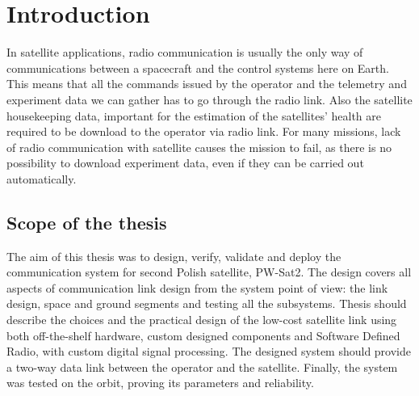 \chapter{Introduction}
In satellite applications, radio communication is usually the only way of communications between a spacecraft and the control systems here on Earth. This means that all the commands issued by the operator and the telemetry and experiment data we can gather has to go through the radio link. Also the satellite housekeeping data, important for the estimation of the satellites' health are required to be download to the operator via radio link. For many missions, lack of radio communication with satellite causes the mission to fail, as there is no possibility to download experiment data, even if they can be carried out automatically.

\section{Scope of the thesis}
The aim of this thesis was to design, verify, validate and deploy the communication system for second Polish satellite, PW-Sat2. The design covers all aspects of communication link design from the system point of view: the link design, space and ground segments and testing all the subsystems. Thesis should describe the choices and the practical design of the low-cost satellite link using both off-the-shelf hardware, custom designed components and Software Defined Radio, with custom digital signal processing. The designed system should provide a two-way data link between the operator and the satellite. Finally, the system was tested on the orbit, proving its parameters and reliability.
